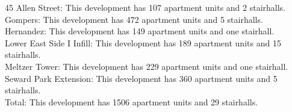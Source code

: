 {45 Allen Street}: This development has 107 apartment units and 2 stairhalls.\\{Gompers}: This development has 472 apartment units and 5 stairhalls.\\{Hernandez}: This development has 149 apartment units and one stairhall.\\{Lower East Side I Infill}: This development has 189 apartment units and 15 stairhalls.\\{Meltzer Tower}: This development has 229 apartment units and one stairhall.\\{Seward Park Extension}: This development has 360 apartment units and 5 stairhalls.\\{Total}: This development has 1506 apartment units and 29 stairhalls.\\